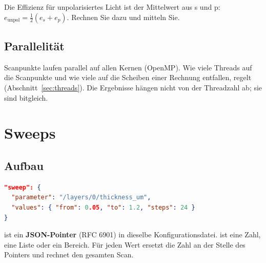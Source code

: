 \begin{tipp}
Die Effizienz für unpolarisiertes Licht ist der Mittelwert aus s und p: $e_{\text{unpol}}=\tfrac12(e_s+e_p)$.
Rechnen Sie dazu  und mitteln Sie.
\end{tipp}

\subsection{Parallelität}
Scanpunkte laufen parallel auf allen Kernen (OpenMP). Wie viele Threads auf die Scanpunkte und wie viele auf die
Scheiben einer Rechnung entfallen, regelt  (Abschnitt~\ref{sec:threads}). Die Ergebnisse hängen nicht
von der Threadzahl ab; sie sind bitgleich.

\section{Sweeps}
%
\subsection{Aufbau}
\begin{lstlisting}[language=json]
"sweep": {
  "parameter": "/layers/0/thickness_um",
  "values": { "from": 0.05, "to": 1.2, "steps": 24 }
}
\end{lstlisting}
 ist ein \textbf{JSON-Pointer} (RFC 6901) in dieselbe Konfigurationsdatei.  ist eine Zahl,
eine Liste oder ein Bereich. Für jeden Wert ersetzt \FG{} die Zahl an der Stelle des Pointers und rechnet den
gesamten Scan.

